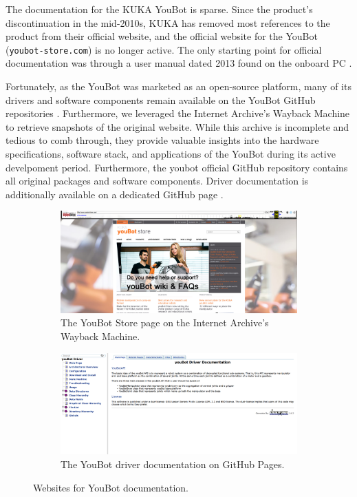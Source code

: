 \documentclass[a4paper, 12pt]{article}
\begin{document}
    The documentation for the KUKA YouBot is sparse. Since the product's discontinuation in the mid-2010s, KUKA has removed most references to the product from their official website, and the official website for the YouBot (\texttt{youbot-store.com}) is no longer active. The only starting point for official documentation was through a user manual dated 2013 found on the onboard PC \cite{KUKAYouBotManual2013}.

    Fortunately, as the YouBot was marketed as an open-source platform, many of its drivers and software components remain available on the YouBot GitHub repositories \cite{githubYoubotOverview}. Furthermore, we leveraged the Internet Archive's Wayback Machine \cite{WaybackMachine} to retrieve snapshots of the original website. While this archive is incomplete and tedious to comb through, they provide valuable insights into the hardware specifications, software stack, and applications of the YouBot during its active develpoment period. Furthermore, the youbot official GitHub repository \cite{githubYoubotOverview} contains all original packages and software components. Driver documentation is additionally available on a dedicated GitHub page \cite{janpaulusYouBotDriver}.

    \begin{figure}[ht]
        \centering
        \begin{subfigure}[t]{0.49\linewidth}
            \centering
            \includegraphics[width=\linewidth]{images/sec2/youbot-store-page.png}
            \caption{The YouBot Store page on the Internet Archive's Wayback Machine.}
        \end{subfigure}
        \hfill
        \begin{subfigure}[t]{0.49\linewidth}
            \centering
            \includegraphics[width=\linewidth]{images/sec2/janpalaus.png}
            \caption{The YouBot driver documentation on GitHub Pages.}
        \end{subfigure}
        \caption{Websites for YouBot documentation.}
\end{figure}
   
\end{document}

